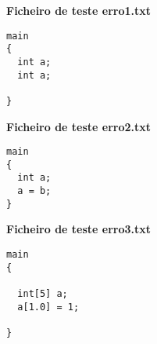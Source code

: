 \documentclass[11pt,a4paper]{report}%
\begin{document}
\textbf{Ficheiro de teste erro1.txt}
\begin{scriptsize}
\begin{verbatim}
main
{
  int a;
  int a;

}
\end{verbatim}
\end{scriptsize}


\textbf{Ficheiro de teste erro2.txt}
\begin{scriptsize}
\begin{verbatim}
main
{
  int a;
  a = b;  
}
\end{verbatim}
\end{scriptsize}


\textbf{Ficheiro de teste erro3.txt}
\begin{scriptsize}
\begin{verbatim}
main
{

  int[5] a;
  a[1.0] = 1;

}
\end{verbatim}
\end{scriptsize}






\end{document}
